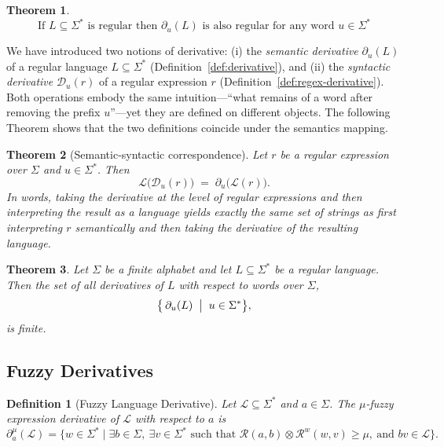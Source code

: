 \documentclass{article}
\newcommand{\cR}{{\mathcal R}}
\def\cut{\mu}
\newtheorem{definition}{Definition}[section]
\newtheorem{theorem}{Theorem}[section]
\begin{document}
\begin{theorem}\label{the:language-derivative-regular}
    $$\text{If }L\subseteq\Sigma^* \text{ is regular then } \partial_u(L) \text{ is also regular for any word } u\in\Sigma^*$$
\end{theorem}

We have introduced two notions of derivative: 
(i) the \emph{semantic derivative}\/ $\partial_{u}(L)$ of a regular language $L\!\subseteq\!\Sigma^{*}$ (Definition~\ref{def:derivative}), and 
(ii) the \emph{syntactic derivative}\/ $\mathcal{D}_{u}(r)$ of a regular expression $r$ (Definition~\ref{def:regex-derivative}). 
Both operations embody the same intuition—``what remains of a word after removing the prefix $u$''—yet they are defined on different objects.  
The following Theorem shows that the two definitions coincide under the semantics mapping.

\begin{theorem}[Semantic-syntactic correspondence]\label{the:two-derivative-mapping}
  Let \(r\) be a regular expression over \(\Sigma\) and \(u\in\Sigma^{*}\).
  Then
  \[
      \mathcal{L}\bigl(\mathcal{D}_{u}(r)\bigr)
      \;=\;
      \partial_{u}\bigl(\mathcal{L}(r)\bigr).
  \]
  In words, taking the derivative at the level of regular expressions and
  then interpreting the result as a language yields exactly the same set of
  strings as first interpreting \(r\) semantically and then taking the
  derivative of the resulting language.
\end{theorem}

\begin{theorem}\label{the:derivative-set-is-finite}
    Let $\Sigma$ be a finite alphabet and let $L \subseteq \Sigma^*$ be a regular language.
    Then the set of all derivatives of $L$ with respect to words over $\Sigma$,
    \[
        \bigl\{\, \partial_{u}(L) \;\bigm|\; u \in \Sigma^* \bigr\},
    \]
    is finite.
\end{theorem}


\subsection{Fuzzy Derivatives}
\begin{definition}[Fuzzy Language Derivative]\label{fuzzyderivative}
Let $\mathcal{L}\subseteq\Sigma^*$ and $a\in\Sigma$. The \emph{$\cut$-fuzzy
expression derivative} of $\mathcal{L}$ with respect to $a$ is
$$
\partial_a^\cut(\mathcal{L})
=
\{w \in \Sigma^* \mid
  \exists b \in \Sigma,\ \exists v\in\Sigma^*
  \text{ such that }
  \cR(a,b)\otimes \mathcal{R}^w(w,v)\ge\cut,\ \text{and } bv \in \mathcal{L}
\}.
$$
\end{definition}
\end{document}

